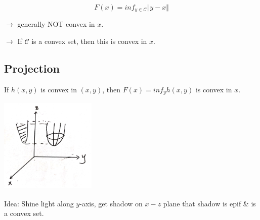 \begin{example}
	


\begin{equation*}
F(x) =inf_{y\in \mathcal{C}}\Vert y-x\Vert
\end{equation*}

$\rightarrow$ generally NOT convex in $x$.

$\rightarrow$ If $\mathcal{C}$ is a convex set, then this is convex in $x$. 
\end{example}

\subsection{Projection} If $h(x, y)$ is convex in $(x,y)$, then $F(x) = inf_yh(x,y)$ is convex in $x$.

\begin{marginfigure}
	\centering
	\includegraphics[width=1.8in,height=1.8in]{figures/ch08/figure1104_2.png}
\end{marginfigure}

Idea: Shine light along $y$-axis, get shadow on $x-z$ plane that shadow is epif \& is a convex set. 

